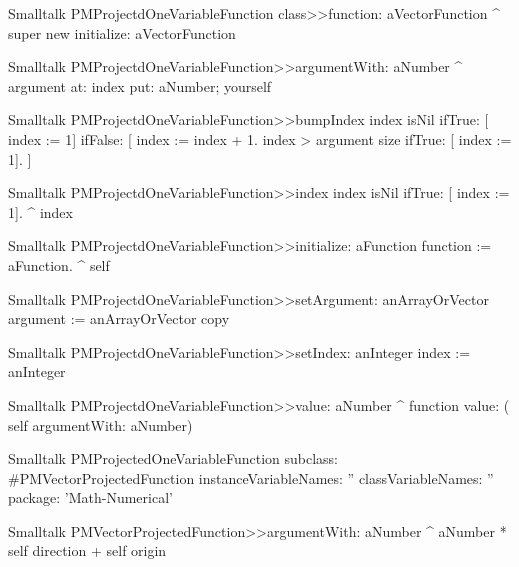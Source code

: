 \begin{displaycode}{Smalltalk}
PMProjectdOneVariableFunction class>>function: aVectorFunction
    ^ super new initialize: aVectorFunction
\end{displaycode}

\begin{displaycode}{Smalltalk}
PMProjectdOneVariableFunction>>argumentWith: aNumber
    ^ argument at: index put: aNumber; yourself
\end{displaycode}

\begin{displaycode}{Smalltalk}
PMProjectdOneVariableFunction>>bumpIndex
    index isNil
        ifTrue: [ index := 1]
        ifFalse: [ index := index + 1.
                  index > argument size
                    ifTrue: [ index := 1].
                ]
\end{displaycode}

\begin{displaycode}{Smalltalk}
PMProjectdOneVariableFunction>>index
    index isNil
        ifTrue: [ index := 1].
    ^ index
\end{displaycode}

\begin{displaycode}{Smalltalk}
PMProjectdOneVariableFunction>>initialize: aFunction
    function := aFunction.
    ^ self
\end{displaycode}

\begin{displaycode}{Smalltalk}
PMProjectdOneVariableFunction>>setArgument: anArrayOrVector
    argument := anArrayOrVector copy
\end{displaycode}

\begin{displaycode}{Smalltalk}
PMProjectdOneVariableFunction>>setIndex: anInteger
    index := anInteger
\end{displaycode}

\begin{displaycode}{Smalltalk}
PMProjectdOneVariableFunction>>value: aNumber
    ^ function value: ( self argumentWith: aNumber)
\end{displaycode}


\begin{displaycode}{Smalltalk}
PMProjectedOneVariableFunction subclass: #PMVectorProjectedFunction
   instanceVariableNames: ''
   classVariableNames: ''
   package: 'Math-Numerical'
\end{displaycode}

\begin{displaycode}{Smalltalk}
PMVectorProjectedFunction>>argumentWith: aNumber
    ^ aNumber * self direction + self origin
\end{displaycode}

